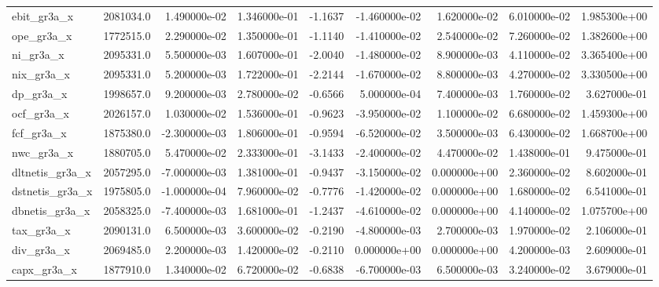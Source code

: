 \documentclass[12pt]{article}
\begin{document}
\begin{landscape}
\begin{longtable}{|l|r|r|r|r|r|r|r|r|}
ebit\_gr3a\_x             &  2081034.0 &  1.490000e-02 &  1.346000e-01 &     -1.1637 & -1.460000e-02 &  1.620000e-02 &  6.010000e-02 &  1.985300e+00 \\
ope\_gr3a\_x              &  1772515.0 &  2.290000e-02 &  1.350000e-01 &     -1.1140 & -1.410000e-02 &  2.540000e-02 &  7.260000e-02 &  1.382600e+00 \\
ni\_gr3a\_x               &  2095331.0 &  5.500000e-03 &  1.607000e-01 &     -2.0040 & -1.480000e-02 &  8.900000e-03 &  4.110000e-02 &  3.365400e+00 \\
nix\_gr3a\_x              &  2095331.0 &  5.200000e-03 &  1.722000e-01 &     -2.2144 & -1.670000e-02 &  8.800000e-03 &  4.270000e-02 &  3.330500e+00 \\
dp\_gr3a\_x               &  1998657.0 &  9.200000e-03 &  2.780000e-02 &     -0.6566 &  5.000000e-04 &  7.400000e-03 &  1.760000e-02 &  3.627000e-01 \\
ocf\_gr3a\_x              &  2026157.0 &  1.030000e-02 &  1.536000e-01 &     -0.9623 & -3.950000e-02 &  1.100000e-02 &  6.680000e-02 &  1.459300e+00 \\
fcf\_gr3a\_x              &  1875380.0 & -2.300000e-03 &  1.806000e-01 &     -0.9594 & -6.520000e-02 &  3.500000e-03 &  6.430000e-02 &  1.668700e+00 \\
nwc\_gr3a\_x              &  1880705.0 &  5.470000e-02 &  2.333000e-01 &     -3.1433 & -2.400000e-02 &  4.470000e-02 &  1.438000e-01 &  9.475000e-01 \\
dltnetis\_gr3a\_x         &  2057295.0 & -7.000000e-03 &  1.381000e-01 &     -0.9437 & -3.150000e-02 &  0.000000e+00 &  2.360000e-02 &  8.602000e-01 \\
dstnetis\_gr3a\_x         &  1975805.0 & -1.000000e-04 &  7.960000e-02 &     -0.7776 & -1.420000e-02 &  0.000000e+00 &  1.680000e-02 &  6.541000e-01 \\
dbnetis\_gr3a\_x          &  2058325.0 & -7.400000e-03 &  1.681000e-01 &     -1.2437 & -4.610000e-02 &  0.000000e+00 &  4.140000e-02 &  1.075700e+00 \\
tax\_gr3a\_x              &  2090131.0 &  6.500000e-03 &  3.600000e-02 &     -0.2190 & -4.800000e-03 &  2.700000e-03 &  1.970000e-02 &  2.106000e-01 \\
div\_gr3a\_x              &  2069485.0 &  2.200000e-03 &  1.420000e-02 &     -0.2110 &  0.000000e+00 &  0.000000e+00 &  4.200000e-03 &  2.609000e-01 \\
capx\_gr3a\_x             &  1877910.0 &  1.340000e-02 &  6.720000e-02 &     -0.6838 & -6.700000e-03 &  6.500000e-03 &  3.240000e-02 &  3.679000e-01 \\

\end{longtable}
\end{landscape}
\end{document}
